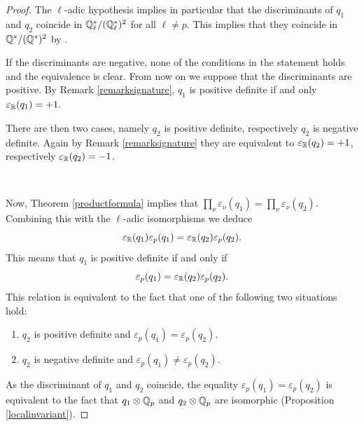 \begin{proof}

The $\ell$-adic hypothesis implies in particular that the discriminants of $q_1$ and $q_2$ coincide in $ \mathbb{Q}_\ell^*/(\mathbb{Q}_\ell^*)^2$
 for all   $\ell\neq p$. This implies that they coincide in $ \mathbb{Q}^*/(\mathbb{Q}^*)^2$
by \cite[Theorem 3 in 5.2]{Ireland}.

If the discriminants are negative, none of the conditions in the statement holds and the equivalence is clear. From now on we suppose that the discriminants are   positive. By Remark \ref{remarksignature}, $q_1$ is positive definite if and only $\varepsilon_{\mathbb{R}}(q_1)=+1.$




There are then two cases, namely $q_2$ is positive definite, respectively $q_2$ is negative definite. Again by Remark \ref{remarksignature} they are equivalent to $\varepsilon_{\mathbb{R}}(q_2)=+1$, respectively $\varepsilon_{\mathbb{R}}(q_2)=-1$.

\


Now, Theorem \ref{productformula} implies that
$\prod_\nu  \varepsilon_\nu(q_1)=\prod_\nu  \varepsilon_\nu(q_2).$
Combining this with the $\ell$-adic isomorphisms we deduce
\[\varepsilon_{\mathbb{R}}(q_1)\varepsilon_p(q_1)=\varepsilon_{\mathbb{R}}(q_2)\varepsilon_p(q_2).\] This means that $q_1$ is positive definite if and only if
 \[\varepsilon_p(q_1)=\varepsilon_{\mathbb{R}}(q_2)\varepsilon_p(q_2).\]
 This relation is equivalent to the fact that one of the following two situations hold:
 \begin{enumerate}
\item   $q_2$ is positive definite and $\varepsilon_p(q_1)=\varepsilon_p(q_2).$
\item  $q_2$ is negative definite and $\varepsilon_p(q_1)\neq\varepsilon_p(q_2).$
\end{enumerate}
As the discriminant of $q_1$ and $q_2$ coincide, the equality $\varepsilon_p(q_1)=\varepsilon_p(q_2)$ is equivalent to the fact that $q_1\otimes \mathbb{Q}_p$ and $q_2\otimes \mathbb{Q}_p$ are isomorphic (Proposition \ref{localinvariant}).
\end{proof}



